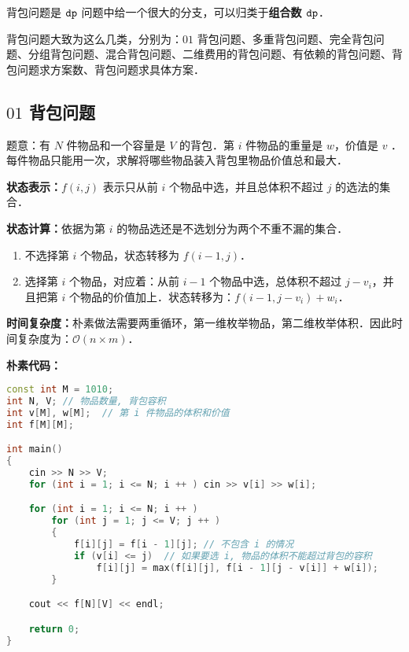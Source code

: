 
背包问题是 $\tt dp$ 问题中给一个很大的分支，可以归类于\textbf{组合数 $\tt dp$}．

背包问题大致为这么几类，分别为：$01$ 背包问题、多重背包问题、完全背包问题、分组背包问题、混合背包问题、二维费用的背包问题、有依赖的背包问题、背包问题求方案数、背包问题求具体方案．

\subsection{$01$ 背包问题}

题意：有 $N$ 件物品和一个容量是 $V$ 的背包．第 $i$ 件物品的重量是 $w$，价值是 $v$ ．每件物品只能用一次，求解将哪些物品装入背包里物品价值总和最大．

\textbf{状态表示：}$f(i, j)$ 表示只从前 $i$ 个物品中选，并且总体积不超过 $j$ 的选法的集合．

\textbf{
状态计算：}依据为第 $i$ 的物品选还是不选划分为两个不重不漏的集合．

\begin{enumerate}
\item 不选择第 $i$ 个物品，状态转移为 $f(i - 1, j)$．
\item 选择第 $i$ 个物品，对应着：从前 $i - 1$ 个物品中选，总体积不超过 $j - v_i$，并且把第 $i$ 个物品的价值加上．状态转移为：$f(i - 1, j - v_i) + w_i$．
\end{enumerate}

\textbf{时间复杂度：}朴素做法需要两重循环，第一维枚举物品，第二维枚举体积．因此时间复杂度为：$\mathcal{O}(n \times m)$．

\textbf{朴素代码：}

\begin{lstlisting}[language=cpp]
const int M = 1010;
int N, V; // 物品数量, 背包容积
int v[M], w[M];  // 第 i 件物品的体积和价值
int f[M][M];

int main()
{
    cin >> N >> V;
    for (int i = 1; i <= N; i ++ ) cin >> v[i] >> w[i];

    for (int i = 1; i <= N; i ++ )
        for (int j = 1; j <= V; j ++ )
        {
            f[i][j] = f[i - 1][j]; // 不包含 i 的情况
            if (v[i] <= j)  // 如果要选 i, 物品的体积不能超过背包的容积
                f[i][j] = max(f[i][j], f[i - 1][j - v[i]] + w[i]);
        }

    cout << f[N][V] << endl;

    return 0;
}
\end{lstlisting}

